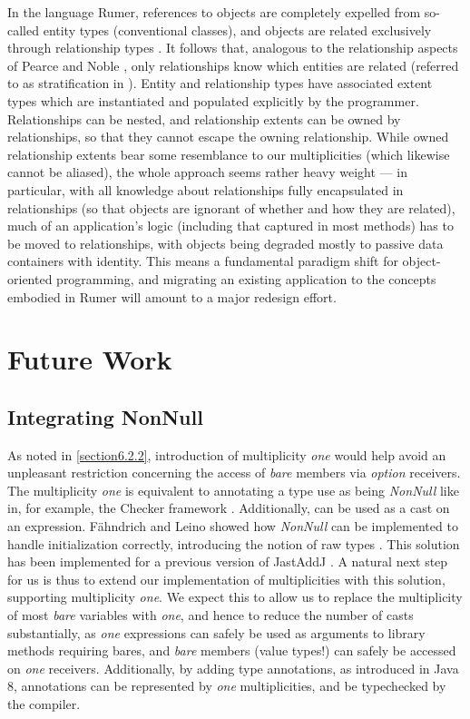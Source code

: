 {In the language Rumer, references to objects are completely expelled from
so-called entity types (conventional classes), and objects are related
exclusively through relationship types \cite{ref1}. It follows that, analogous to
the relationship aspects of Pearce and Noble \cite{ref33}, only relationships know
which entities are related (referred to as stratification in \cite{ref1}). Entity
and relationship types have associated extent types which are instantiated
and populated explicitly by the programmer. Relationships can be nested, and
relationship extents can be owned by relationships, so that they cannot
escape the owning relationship. While owned relationship extents bear some
resemblance to our multiplicities (which likewise cannot be aliased), the
whole approach seems rather heavy weight --- in particular, with all knowledge
about relationships fully encapsulated in relationships (so that objects are
ignorant of whether and how they are related), much of an application's
logic (including that captured in most methods) has to be moved to
relationships, with objects being degraded mostly to passive data containers
with identity. This means a fundamental paradigm shift for object-oriented
programming, and migrating an existing application to the concepts embodied
in Rumer will amount to a major redesign effort.

\section{Future Work}
\label{section8}

\subsection{Integrating NonNull}
\label{section8.1}

\noindent As noted in \autoref{section6.2.2}, introduction of multiplicity
\emph{one} would help avoid an unpleasant restriction concerning the
access of \emph{bare} members via \emph{option} receivers. The
multiplicity \emph{one} is equivalent to annotating a type use as being
\emph{NonNull} like in, for example, the Checker framework \cite{ref11}.
Additionally,  can be used as a cast on an expression.
Fähndrich and Leino showed how \emph{NonNull} can be implemented to
handle initialization correctly, introducing the notion of raw types \cite{ref15}.
This solution has been implemented for a previous version of JastAddJ \cite{ref14}.
A natural next step for us is thus to extend our implementation of
multiplicities with this solution, supporting multiplicity \emph{one}.
We expect this to allow us to replace the multiplicity of most
\emph{bare} variables with \emph{one}, and hence to reduce the
number of casts substantially, as \emph{one} expressions can safely be
used as arguments to library methods requiring bares, and \emph{bare}
members (value types!) can safely be accessed on \emph{one} receivers.
Additionally, by adding type annotations, as introduced in Java 8,
 annotations can be represented by \emph{one}
multiplicities, and be typechecked by the compiler.

}
